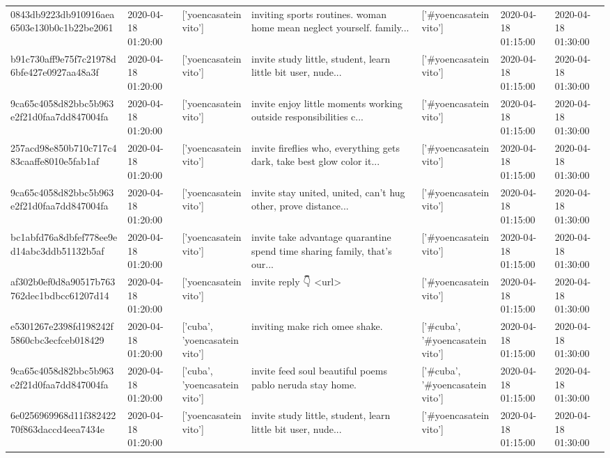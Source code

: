 \begin{tabular}{lllllll}
0843db9223db910916aea6503e130b0c1b22be2061 & 2020-04-18 01:20:00 & ['yoencasateinvito'] & inviting sports routines. woman home mean neglect yourself. family... & ['#yoencasateinvito'] & 2020-04-18 01:15:00 & 2020-04-18 01:30:00 \\
b91c730aff9e75f7c21978d6bfe427e0927aa48a3f & 2020-04-18 01:20:00 & ['yoencasateinvito'] & invite study little, student, learn little bit user, nude... & ['#yoencasateinvito'] & 2020-04-18 01:15:00 & 2020-04-18 01:30:00 \\
9ca65c4058d82bbc5b963e2f21d0faa7dd847004fa & 2020-04-18 01:20:00 & ['yoencasateinvito'] & invite enjoy little moments working outside responsibilities c... & ['#yoencasateinvito'] & 2020-04-18 01:15:00 & 2020-04-18 01:30:00 \\
257acd98e850b710c717c483caaffe8010e5fab1af & 2020-04-18 01:20:00 & ['yoencasateinvito'] & invite fireflies who, everything gets dark, take best glow color it... & ['#yoencasateinvito'] & 2020-04-18 01:15:00 & 2020-04-18 01:30:00 \\
9ca65c4058d82bbc5b963e2f21d0faa7dd847004fa & 2020-04-18 01:20:00 & ['yoencasateinvito'] & invite stay united, united, can't hug other, prove distance... & ['#yoencasateinvito'] & 2020-04-18 01:15:00 & 2020-04-18 01:30:00 \\
bc1abfd76a8dbfef778ee9ed14abc3ddb51132b5af & 2020-04-18 01:20:00 & ['yoencasateinvito'] & invite take advantage quarantine spend time sharing family, that's our... & ['#yoencasateinvito'] & 2020-04-18 01:15:00 & 2020-04-18 01:30:00 \\
af302b0ef0d8a90517b763762dec1bdbcc61207d14 & 2020-04-18 01:20:00 & ['yoencasateinvito'] & invite reply 👇 <url> & ['#yoencasateinvito'] & 2020-04-18 01:15:00 & 2020-04-18 01:30:00 \\
e5301267e2398fd198242f5860cbc3ecfceb018429 & 2020-04-18 01:20:00 & ['cuba', 'yoencasateinvito'] & inviting make rich omee shake. & ['#cuba', '#yoencasateinvito'] & 2020-04-18 01:15:00 & 2020-04-18 01:30:00 \\
9ca65c4058d82bbc5b963e2f21d0faa7dd847004fa & 2020-04-18 01:20:00 & ['cuba', 'yoencasateinvito'] & invite feed soul beautiful poems pablo neruda stay home. & ['#cuba', '#yoencasateinvito'] & 2020-04-18 01:15:00 & 2020-04-18 01:30:00 \\
6e0256969968d11f38242270f863daccd4eea7434e & 2020-04-18 01:20:00 & ['yoencasateinvito'] & invite study little, student, learn little bit user, nude... & ['#yoencasateinvito'] & 2020-04-18 01:15:00 & 2020-04-18 01:30:00 \\

\end{tabular}
